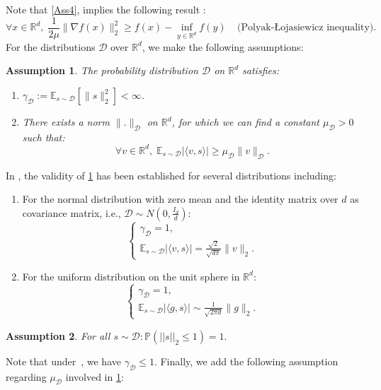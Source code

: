 \documentclass{article} %
\newtheorem{assumption}{Assumption}
\begin{document}
Note that  \cref{Ass4}, implies the following result \cite[Theorem 2.1.8]{nesterov2013introductory}: 
$$\forall x \in \mathbb{R}^d,\; \frac{1}{2 \mu} \lVert \nabla f(x) \rVert_2^2 \ge f(x)-\inf_{y \in \mathbb{R}^d} f(y)\;\;\;\; \text{(Polyak-{\L}ojasiewicz inequality)}.$$
For the distributions $\mathcal{D}$ over $\mathbb{R}^d$, we make the following assumptions:  
\begin{assumption}\label{Ass5}
    The probability distribution $\mathcal{D}$ on $\mathbb{R}^d$ satisfies:
\begin{enumerate}
    \item $\gamma_{\mathcal{D}}:=\mathbb{E}_{s \sim \mathcal{D}}[ \lVert s \rVert_2^2 ]<\infty$.
    \item There exists a norm $\lVert .  \rVert_{\mathcal{D}}$ on $\mathbb{R}^d$, for which we can find a  constant $\mu_\mathcal{D}>0$ such that:
    $$\forall v \in \mathbb{R}^d,\;  \mathbb{E}_{s \sim \mathcal{D} } | \langle v,s \rangle | \ge \mu_{\mathcal{D}} \lVert v\rVert_\mathcal{D}.$$
\end{enumerate}
\end{assumption}
In \cite[Lemma 3.4]{bergou2020stochastic}, the validity of \cref{Ass5} has been established for several distributions including:

 \begin{enumerate}[label=(\roman*)]   
    \item \label{NorDis} For the normal distribution with zero mean and the  identity matrix over $d$ as covariance matrix, i.e., $\mathcal{D} \sim N(0,\frac{I_d}{d})$:
    \[
    \begin{cases}
        \gamma_{\mathcal{D}}=1, \\
        \mathbb{E}_{s \sim \mathcal{D}}|\langle v, s\rangle|=\frac{\sqrt{2}}{\sqrt{d \pi}}\|v\|_2.
    \end{cases}
    \]
     \item \label{unit-sphere}  For the uniform distribution on the unit sphere in \( \mathbb{R}^d \):
$$
    \begin{cases}
    \gamma_{\mathcal{D}}=1,\\
    \mathbb{E}_{s \sim \mathcal{D}} \left| \langle g, s \rangle \right| \sim \frac{1}{\sqrt{2 \pi d}} \|g\|_2.
    \end{cases}
$$
\end{enumerate}

\begin{assumption}\label{Ass6}
 For all $s \sim \mathcal{D}: \mathbb{P}\left( ||s||_2 \le  1 \right)=1.$     
\end{assumption}
Note that under~, we have $\gamma_{\mathcal{D}}\le 1$. 
Finally, we add the following assumption regarding $\mu_{\mathcal{D}}$ involved in \cref{Ass5}:
\end{document}
